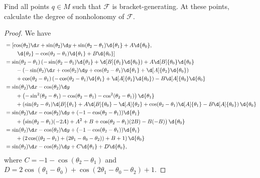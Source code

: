 \documentclass{article}
\begin{document}
 Find all points $q \in M$ such that $\mathcal F$ is bracket-generating. At these points, calculate the degree of nonholonomy of $\mathcal F$.
\begin{proof}
We have
\begin{align*}
[X_1, X_2] & = \left[ \cos(\theta_2) \d x  + \sin(\theta_2) \d y  + \sin(\theta_2 - \theta_1)  \d {\theta_1} + A \d {\theta_0}, \right.
\\ & \quad \quad \left. \d {\theta_2} - \cos(\theta_2 - \theta_1) \d {\theta_1} + B \d {\theta_0} \right]
\\ & =  \sin(\theta_2 - \theta_1) \left( -\sin(\theta_2 - \theta_1) \d {\theta_1} + \d[B] {\theta_1} \d {\theta_0} \right) + A \d[B] {\theta_0} \d {\theta_0}
\\ & \quad \quad - \left( -\sin(\theta_2) \d x + \cos(\theta_2) \d y + \cos (\theta_2 - \theta_1) \d {\theta_1} + \d[A] {\theta_2} \d {\theta_0} \right) 
\\ & \quad \quad + \cos(\theta_2 - \theta_1) \left( -\cos(\theta_2 - \theta_1) \d {\theta_1} + \d[A] {\theta_1} \d {\theta_0} \right) - B \d[A] {\theta_0} \d {\theta_0}
\\ & = \sin(\theta_2) \d x  - \cos(\theta_2) \d y  
\\ & \quad \quad + \left(- \sin^2(\theta_2 - \theta_1) - \cos (\theta_2 - \theta_1) - \cos^2(\theta_2 - \theta_1) \right) \d {\theta_1}
\\ & \quad \quad + \left(  \sin (\theta_2 - \theta_1) \d[B] {\theta_1}  + A \d[B] {\theta_0} -  \d[A]{\theta_2} + \cos(\theta_2 - \theta_1) \d[A] {\theta_1} - B \d[A]{\theta_0} \right) \d {\theta_0}
\\ & = \sin(\theta_2) \d x  - \cos(\theta_2) \d y + (-1 - \cos(\theta_2 - \theta_1)) \d {\theta_1}
\\ & \quad \quad + \left(  \sin (\theta_2 - \theta_1) (-2A)  + A^2 +  B + \cos(\theta_2 - \theta_1) (2B) - B(-B) \right) \d {\theta_0}
\\ & = \sin(\theta_2) \d x  - \cos(\theta_2) \d y + (-1 - \cos(\theta_2 - \theta_1)) \d {\theta_1}
\\ & \quad \quad  + \left( 2 \cos((\theta_2 - \theta_1) + (2\theta_1 - \theta_0 - \theta_2)) +  B + 1  \right) \d {\theta_0}
\\ & = \sin(\theta_2) \d x  - \cos(\theta_2) \d y + C \d {\theta_1} + D \d {\theta_0},
\end{align*}
where $C = -1 - \cos(\theta_2 - \theta_1) $
 and $D = 2 \cos(\theta_1 - \theta_0) +  \cos(2 \theta_1 - \theta_0 - \theta_2) + 1$.


\end{proof}
\end{document}
